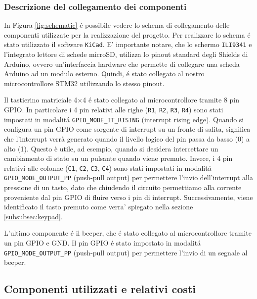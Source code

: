 \documentclass[a4paper]{article}
\begin{document}
\subsubsection{Descrizione del collegamento dei componenti}\label{subsubsec:collegamenti}

In Figura \ref{fig:schematic} é possibile vedere lo schema di collegamento
delle componenti utilizzate per la realizzazione del progetto. Per realizzare lo schema é stato utilizzato il software \texttt{KiCad}. E' importante notare, che lo schermo \texttt{ILI9341} e l'integrato lettore di schede microSD, utilizza lo pinout standard degli Shields di Arduino, ovvero un'interfaccia hardware che permette di collegare una scheda Arduino ad un modulo esterno. Quindi, é stato collegato al nostro microcontrollore STM32 utilizzando lo stesso pinout.

Il tastierino matriciale 4$\times$4 é stato collegato al microcontrollore tramite 8 pin GPIO. In particolare i 4 pin relativi alle righe (\texttt{R1}, \texttt{R2}, \texttt{R3}, \texttt{R4}) sono stati impostati in modalitá \texttt{GPIO\_MODE\_IT\_RISING} (interrupt rising edge). Quando si configura un pin GPIO come sorgente di interrupt su un fronte di salita, significa che l'interrupt verrà generato quando il livello logico del pin passa da basso (0) a alto (1). Questo è utile, ad esempio, quando si desidera intercettare un cambiamento di stato su un pulsante quando viene premuto. Invece, i 4 pin relativi alle colonne (\texttt{C1}, \texttt{C2}, \texttt{C3}, \texttt{C4}) sono stati impostati in modalitá \texttt{GPIO\_MODE\_OUTPUT\_PP} (push-pull output) per permettere l'invio dell'interrupt alla pressione di un tasto, dato che chiudendo il circuito permettiamo alla corrente proveniente dal pin GPIO di fluire verso i pin di interrupt. Successivamente, viene identificato il tasto premuto come verra' spiegato nella sezione \ref{subsubsec:keypad}.

L'ultimo componente é il beeper, che é stato collegato al microcontrollore tramite un pin GPIO e GND. Il pin GPIO é stato impostato in modalitá \texttt{GPIO\_MODE\_OUTPUT\_PP} (push-pull output) per permettere l'invio di un segnale al beeper.


\subsection{Componenti utilizzati e relativi costi}
\end{document}
